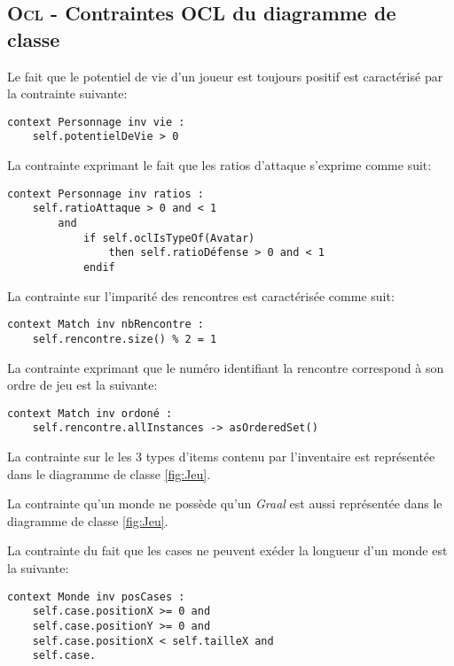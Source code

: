 
\subsection{\textsc{Ocl} - Contraintes OCL du diagramme de classe}
\label{sec:question-4}


Le fait que le potentiel de vie d'un joueur est toujours positif est caractérisé par la contrainte suivante:

\begin{lstlisting}[caption=Contrainte sur lpotentiel de vie,captionpos=b,label={lst:vie},language=OCL]
context Personnage inv vie :
	self.potentielDeVie > 0
\end{lstlisting}

La contrainte exprimant le fait que les ratios d'attaque s'exprime comme suit:

\begin{lstlisting}[caption=Contrainte sur les ratios,captionpos=b,label={lst:ratios},language=OCL]
context Personnage inv ratios :
	self.ratioAttaque > 0 and < 1
		and
			if self.oclIsTypeOf(Avatar)
				then self.ratioDéfense > 0 and < 1
			endif
\end{lstlisting}

La contrainte sur l'imparité des rencontres est caractérisée comme suit:

\begin{lstlisting}[caption=Contrainte sur l'imparité des rencontres,captionpos=b,label={lst:impair},language=OCL]
context Match inv nbRencontre :
	self.rencontre.size() % 2 = 1
\end{lstlisting}

La contrainte exprimant que le numéro identifiant la rencontre correspond à son ordre de jeu est la suivante:

\begin{lstlisting}[caption=Contrainte sur l'ordre des rencontres,captionpos=b,label={lst:ordreRencontres},language=OCL]
context Match inv ordoné :
	self.rencontre.allInstances -> asOrderedSet()
\end{lstlisting}

La contrainte sur le les 3 types d'items contenu par l'inventaire est représentée dans le diagramme de classe \ref{fig:Jeu}.

La contrainte qu'un monde ne possède qu'un \emph{Graal} est aussi représentée dans le diagramme de classe \ref{fig:Jeu}.

La contrainte du fait que les cases ne peuvent exéder la longueur d'un monde est la suivante:

\begin{lstlisting}
context Monde inv posCases :
	self.case.positionX >= 0 and
	self.case.positionY >= 0 and
	self.case.positionX < self.tailleX and
	self.case.
\end{lstlisting}